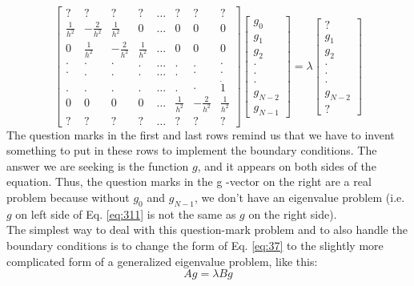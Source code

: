 				\begin{equation}\label{eq:311}
\left[\begin{array}{cccccccc}
? & ? & ? & ? & \ldots & ? & ? & ? \\
\frac{1}{h^{2}} & -\frac{2}{h^{2}} & \frac{1}{h^{2}} & 0 & \ldots & 0 & 0 & 0 \\
0 & \frac{1}{h^{2}} & -\frac{2}{h^{2}} & \frac{1}{h^{2}} & \ldots & 0 & 0 & 0 \\
\cdot & \cdot & \cdot & . & \ldots & . & . & \cdot \\
\cdot & . & . & . & \ldots & . & \cdot & \cdot \\
. & . & . & . & \ldots & . & \cdot & \dot{1} \\
0 & 0 & 0 & 0 & \ldots & \frac{1}{h^{2}} & -\frac{2}{h^{2}} & \frac{1}{h^{2}} \\
? & ? & ? & ? & \ldots & ? & ? & ?
\end{array}\right]\left[\begin{array}{r}
g_{0} \\
g_{1} \\
g_{2} \\
\cdot \\
\cdot \\
\cdot \\
g_{N-2} \\
g_{N-1}
\end{array}\right]=\lambda\left[\begin{array}{r}
? \\
g_{1} \\
g_{2} \\
\cdot \\
\cdot \\
\cdot \\
g_{N-2} \\
?
\end{array}\right]
\end{equation}
The question marks in the first and last rows remind us that we have to invent
something to put in these rows to implement the boundary conditions. The
answer we are seeking is the function $g$, and it appears on both sides of the
equation. Thus, the question marks in the
g -vector on the right are a real problem
because without
$g_0$ and
$g_{N-1}$, we don\rq t have an eigenvalue problem (i.e.
$g$ on left
side of Eq. \ref{eq:311} is not the same as
$g$ on the right side). \\ 
The simplest way to deal with this question-mark problem and to also handle
the boundary conditions is to change the form of Eq. \ref{eq:37} to the slightly more
complicated form of a generalized eigenvalue problem, like this:
\begin{equation}\label{eq:312}
		Ag = \lambda Bg
				\end{equation}

